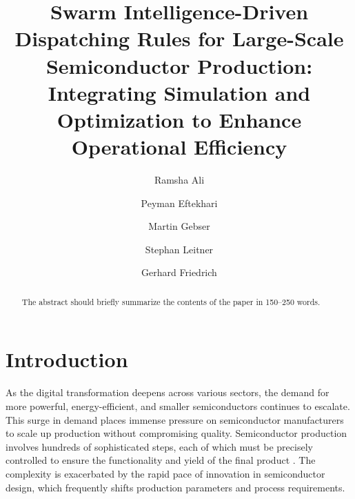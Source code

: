 \documentclass[runningheads]{llncs}
\begin{document}
%
\title{Swarm Intelligence-Driven Dispatching Rules for Large-Scale Semiconductor Production: Integrating Simulation and Optimization to Enhance Operational Efficiency
}
%
%
\author{Ramsha Ali \and
Peyman Eftekhari \and
Martin Gebser \and
Stephan Leitner \and
Gerhard Friedrich
}
%
%

%
\maketitle              %
%
\begin{abstract}
The abstract should briefly summarize the contents of the paper in
150--250 words.

\end{abstract}
%
%
%
\section{Introduction}
\label{sec:introduction}
As the digital transformation deepens across various sectors, the demand for more powerful, energy-efficient, and smaller semiconductors continues to escalate. This surge in demand places immense pressure on semiconductor manufacturers to scale up production without compromising quality. Semiconductor production involves hundreds of sophisticated steps, each of which must be precisely controlled to ensure the functionality and yield of the final product \cite{kopp2020smt2020}. The complexity is exacerbated by the rapid pace of innovation in semiconductor design, which frequently shifts production parameters and process requirements.
\end{document}
